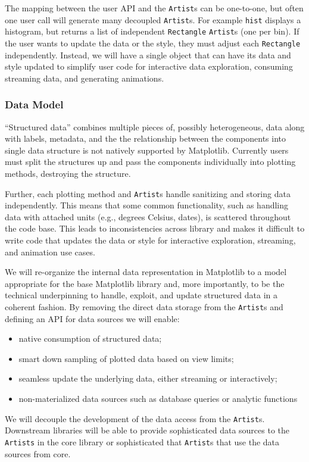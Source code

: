 \documentclass[11pt]{article}  %
\begin{document}
The mapping between the user API and the \texttt{Artist}s can be
one-to-one, but often one user call will generate many decoupled
\texttt{Artist}s.  For example \texttt{hist} displays a histogram, but
returns a list of independent \texttt{Rectangle} \texttt{Artist}s (one
per bin).  If the user wants to update the data or the style, they
must adjust each \texttt{Rectangle} independently.  Instead, we will
have a single object that can have its data and style updated to
simplify user code for interactive data exploration, consuming
streaming data, and generating animations.



\subsubsection{Data Model}
\label{sec:dm}

``Structured data'' combines multiple pieces of, possibly
heterogeneous, data along with labels, metadata, and the the
relationship between the components into single data structure is
not natively supported by Matplotlib.
 Currently users must split the structures up and pass the
components individually into
plotting methods, destroying the structure.


Further, each plotting method and \texttt{Artist}s handle sanitizing
and storing data independently.  This means that some common
functionality, such as handling data with attached units (e.g.,
degrees Celsius, dates), is scattered throughout the code base.  This
leads to inconsistencies across library and makes it difficult to
write code that updates the data or style for interactive exploration,
streaming, and animation use cases.


We will re-organize the internal data representation in Matplotlib to
a model appropriate for the base Matplotlib library and, more
importantly, to be the technical underpinning to handle, exploit, and
update structured data in a coherent fashion.
By removing the direct data storage from
the \texttt{Artist}s and defining an API for data sources we will enable:
\begin{itemize}[noitemsep]
  \item native consumption of structured data;
  \item smart down sampling of plotted data based on view limits;
  \item seamless update the underlying data, either
    streaming or interactively;
  \item non-materialized data sources such as database queries or analytic functions
\end{itemize}
We will decouple the development of the data access from the
\texttt{Artist}s.  Downstream libraries will be able to provide
sophisticated data sources to the \texttt{Artists} in the core library
or sophisticated that \texttt{Artist}s that use the data sources from
core.
\end{document}
